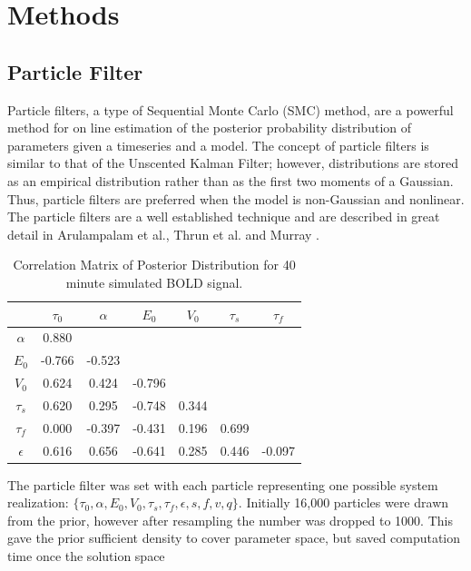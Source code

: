 \documentclass{article}
\begin{document}
\section{Methods}
\label{sec:Methods}
\subsection{Particle Filter}
\label{sec:ParticleFilter}
Particle filters, a type of Sequential Monte Carlo (SMC) method,
are a powerful method for on line estimation of the posterior probability 
distribution of parameters given a timeseries and a model. The concept of 
particle filters is similar to that of the Unscented Kalman Filter; however,
distributions are stored as an empirical distribution rather than 
as the first two moments of a Gaussian. Thus, particle filters are 
preferred when the model is non-Gaussian and nonlinear. 
The particle filters are a well established technique and are 
described in great detail in Arulampalam et al., Thrun et al. 
and Murray \cite{Arulampalam2002a, thrun2008probabilistic, Murray2008}.
\begin{table}[t]
\ninept
  \centering
\begin{tabular}{|c | c  c  c  c  c  c  |}
\hline
  & $\tau_0$ & $\alpha$ & $E_0$    & $V_0$    & $\tau_s$ & $\tau_f$  \\
\hline
$\alpha$                      & 0.880& & & & & \\
\rowcolor[gray]{.8} $E_0$     & -0.766& -0.523& & & & \\
$V_0$                         & 0.624& 0.424& -0.796& & & \\
\rowcolor[gray]{.8} $\tau_s$  & 0.620& 0.295& -0.748& 0.344& & \\
$\tau_f$                      & 0.000& -0.397& -0.431& 0.196& 0.699& \\
\rowcolor[gray]{.8} $\epsilon$& 0.616& 0.656& -0.641& 0.285& 0.446& -0.097\\
\hline
\end{tabular}
  \caption{Correlation Matrix of Posterior Distribution for 40 minute simulated BOLD signal.}
\label{tab:long_corr}
\end{table}
The particle filter was set with each particle representing one possible 
system realization: $\{\tau_0, \alpha, E_0, V_0, \tau_s, \tau_f,
\epsilon, s, f, v, q\}$. Initially 16,000 particles were drawn
from the prior, however after resampling the number was dropped
to 1000. This gave the prior sufficient density to
cover parameter space, but saved computation time once the solution space
\end{document}
